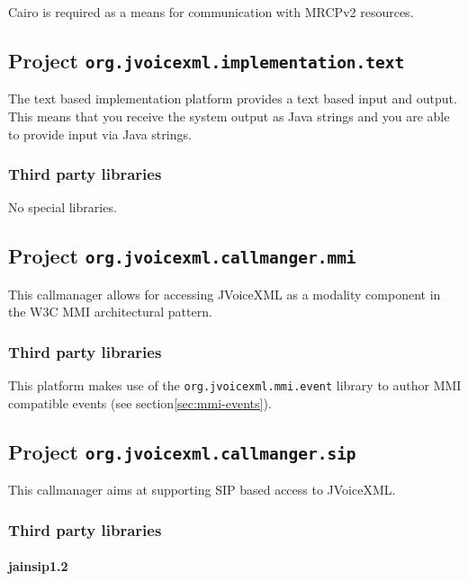\documentclass[11pt,a4paper]{article}
\begin{document}
Cairo is required as a means for communication with MRCPv2 resources.

\subsection{Project \texttt{org.jvoicexml.implementation.text}}

The text based implementation platform provides a text based input and output.
This means that you receive the system output as Java strings and you are able
to provide input via Java strings.

\subsubsection{Third party libraries}
\label{sec:text-third-party-libr}

No special libraries.

\subsection{Project \texttt{org.jvoicexml.callmanger.mmi}}

This callmanager allows for accessing JVoiceXML as a modality component in
the W3C MMI architectural pattern.

\subsubsection{Third party libraries}

This platform makes use of the \lstinline{org.jvoicexml.mmi.event} library
to author MMI compatible events (see section\ref{sec:mmi-events}).

\subsection{Project \texttt{org.jvoicexml.callmanger.sip}}

This callmanager aims at supporting SIP based access to JVoiceXML.

\subsubsection{Third party libraries}

\paragraph{jainsip1.2}
\end{document}

